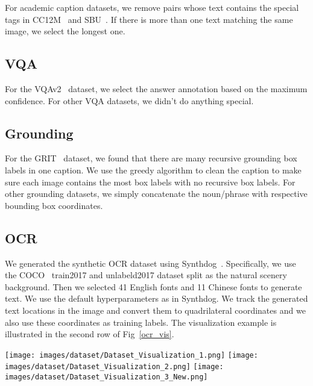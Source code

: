 \documentclass{article}
\begin{document}
For academic caption datasets, we remove pairs whose text contains the special tags in CC12M~\citep{cc12m} and SBU~\citep{sbu}. If there is more than one text matching the same image, we select the longest one.

\subsection{VQA}
For the VQAv2~\citep{VQAv2} dataset, we select the answer annotation based on the maximum confidence. For other VQA datasets, we didn't do anything special.

\subsection{Grounding}
For the GRIT~\citep{kosmos2} dataset, we found that there are many recursive grounding box labels in one caption. We use the greedy algorithm to clean the caption to make sure each image contains the most box labels with no recursive box labels. For other grounding datasets, we simply concatenate the noun/phrase with respective bounding box coordinates.

\subsection{OCR}

We generated the synthetic OCR dataset using Synthdog~\citep{synthdog}. Specifically, we use the COCO~\citep{lin2014microsoft} train2017 and unlabeld2017 dataset split as the natural scenery background. Then we selected 41 English fonts and 11 Chinese fonts to generate text. We use the default hyperparameters as in Synthdog. We track the generated text locations in the image and convert them to quadrilateral coordinates and we also use these coordinates as training labels. The visualization example is illustrated in the second row of Fig~\ref{ocr_vis}.

\begin{figure*}[htp]
\centering
\texttt{[image: images/dataset/Dataset\_Visualization\_1.png]}
\texttt{[image: images/dataset/Dataset\_Visualization\_2.png]}
\texttt{[image: images/dataset/Dataset\_Visualization\_3\_New.png]}
   \caption{Visualization of the Grounding and OCR data used for training Qwen-VL}
\label{ocr_vis}
\end{figure*}
\end{document}
